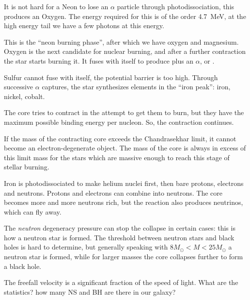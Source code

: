 \documentclass[main.tex]{subfiles}
\begin{document}
It is not hard for a Neon to lose an \(\alpha \) particle through photodissociation, this produces an Oxygen. 
The energy required for this is of the order \SI{4.7}{MeV}, at the high energy tail we have a few photons at this energy. 

This is the ``neon burning phase'', after which we have oxygen and magnesium. Oxygen is the next candidate for nuclear burning, and after a further contraction the star starts burning it. It fuses with itself to produce  plus an \(\alpha \), or .

Sulfur cannot fuse with itself, the potential barrier is too high. 
Through successive \(\alpha \) captures, the star synthesizes elements in the ``iron peak'': iron, nickel, cobalt. 

The core tries to contract in the attempt to get them to burn, but they have the maximum possible binding energy per nucleon. 
So, the contraction continues. 

If the mass of the contracting core exceeds the Chandrasekhar limit, it cannot become an electron-degenerate object. 
The mass of the core is always in excess of this limit mass for the stars which are massive enough to reach this stage of stellar burning. 

Iron is photodissociated to make helium nuclei first, then bare protons, electrons and neutrons. 
Protons and electrons can combine into neutrons. The core becomes more and more neutrons rich, but the reaction also produces neutrinos, which can fly away.

The \emph{neutron} degeneracy pressure can stop the collapse in certain cases: this is how a neutron star is formed. 
The threshold between neutron stars and black holes is hard to determine, but generally speaking with \(8 M_{\odot} < M < 25 M_{\odot}\) a neutron star is formed, while for larger masses the core collapses further to form a black hole. 

The freefall velocity is a significant fraction of the speed of light.
What are the statistics? how many NS and BH are there in our galaxy?
\end{document}

